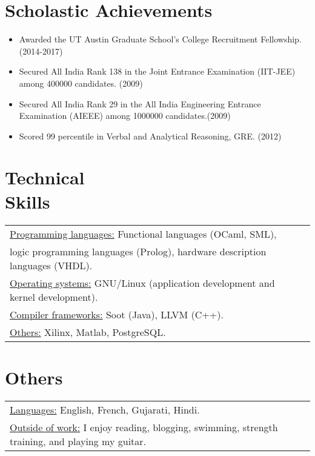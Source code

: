 \documentclass[margin]{res}
\begin{document}
\begin{resume}
\section{Scholastic Achievements}
 \begin{itemize} \itemsep -2pt  %
 \item Awarded the UT Austin Graduate School's College Recruitment
   Fellowship. \hfill (2014-2017)
 \item Secured All India Rank 138 in the Joint Entrance Examination
   (IIT-JEE) among 400000 candidates. \hfill (2009)
 \item Secured All India Rank 29 in the All India Engineering Entrance
   Examination (AIEEE) among 1000000 candidates.\hfill (2009)
 \item Scored 99 percentile in Verbal and Analytical Reasoning,
   GRE. \hfill (2012)
 \end{itemize}

\section{Technical \\ Skills}
   \begin{tabular}{l p{3in}}
    \underline{Programming languages:} Functional languages (OCaml,
    SML), \\ logic programming languages (Prolog),
    hardware description languages (VHDL). \\

    \underline{Operating systems:} GNU/Linux (application development
    and kernel development). \\

    \underline{Compiler frameworks:} Soot (Java), LLVM (C++). \\

    \underline{Others:} Xilinx, Matlab, PostgreSQL. \\
 \end{tabular}

\section{Others}
\begin{tabular}{l p{3in}}
  \underline{Languages:} English, French, Gujarati, Hindi. \\
  \underline{Outside of work:} I enjoy reading, blogging, swimming,
  strength training, and playing my guitar.
\end{tabular}

\end{resume} 
\end{document}
